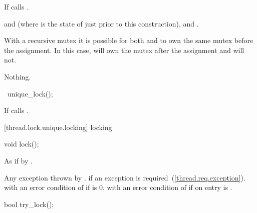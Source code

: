 \begin{itemdescr}
\pnum\effects If  calls .

\pnum\postconditions {} and  (where  is the state of  just prior to this construction),   and .

\pnum
\begin{note} With a recursive mutex it is possible for both  and  to own the same mutex before the assignment. In this case,  will own the mutex after the assignment and  will not. \end{note}

\pnum\throws Nothing.
\end{itemdescr}


%
\begin{itemdecl}
~unique_lock();
\end{itemdecl}

\begin{itemdescr}
\pnum\effects If  calls .
\end{itemdescr}

[thread.lock.unique.locking]{ locking}

%
%
\begin{itemdecl}
void lock();
\end{itemdecl}

\begin{itemdescr}
\pnum
\effects As if by .

\pnum
\postcondition {}

\pnum
\throws
Any exception thrown by .  if an exception
is required~(\ref{thread.req.exception}).  with an error
condition of  if  is 0. 
with an error condition of  if on entry 
is .
\end{itemdescr}

%
%
\begin{itemdecl}
bool try_lock();
\end{itemdecl}

